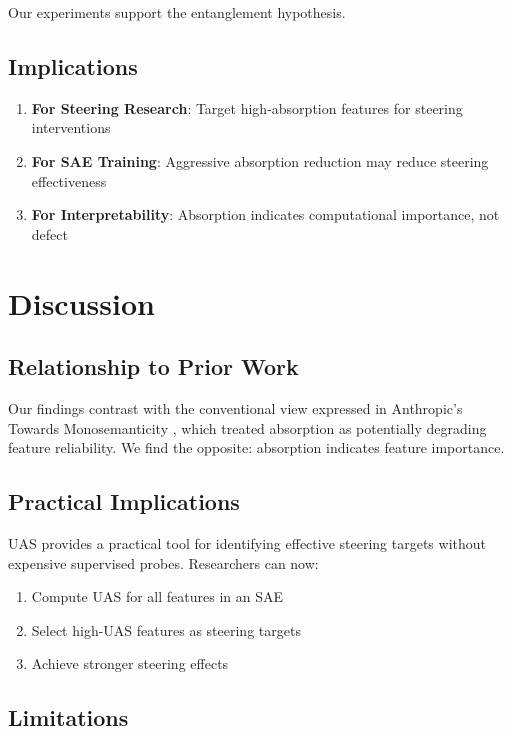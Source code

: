 \documentclass{article}
\begin{document}
Our experiments support the entanglement hypothesis.

\subsection{Implications}

\begin{enumerate}
    \item \textbf{For Steering Research}: Target high-absorption features for steering interventions
    \item \textbf{For SAE Training}: Aggressive absorption reduction may reduce steering effectiveness
    \item \textbf{For Interpretability}: Absorption indicates computational importance, not defect
\end{enumerate}


\section{Discussion}

\subsection{Relationship to Prior Work}

Our findings contrast with the conventional view expressed in Anthropic's Towards Monosemanticity \citep{anthropic2023towards}, which treated absorption as potentially degrading feature reliability. We find the opposite: absorption indicates feature importance.

\subsection{Practical Implications}

UAS provides a practical tool for identifying effective steering targets without expensive supervised probes. Researchers can now:
\begin{enumerate}
    \item Compute UAS for all features in an SAE
    \item Select high-UAS features as steering targets
    \item Achieve stronger steering effects
\end{enumerate}

\subsection{Limitations}
\end{document}
